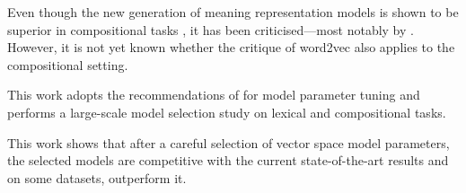Even though the new generation of meaning representation models is shown to be superior in compositional tasks \cite{milajevs-EtAl:2014:EMNLP2014}, it has been criticised---most notably by . However, it is not yet known whether the critique of word2vec also applies to the compositional setting.
%
%
%

This work adopts the recommendations of  for model parameter tuning and performs a large-scale model selection study on lexical and compositional tasks.
%
%

This work shows that after a careful selection of  vector space model parameters, the selected models are competitive with the current state-of-the-art results and on some datasets, outperform it.
%
%
%

